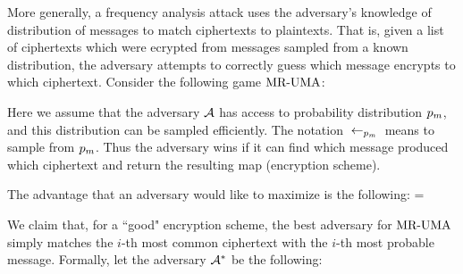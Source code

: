     More generally, a frequency analysis attack uses the adversary's knowledge of distribution of messages to match ciphertexts to plaintexts. That is, given a list of ciphertexts which were ecrypted from messages sampled from a known distribution, the adversary attempts to correctly guess which message encrypts to which ciphertext. Consider the following game $\textnormal{MR-UMA}$:
    
\begin{figure}[H]
\centering
{}
\end{figure}

Here we assume that the adversary ${\mathcal A}$ has access to probability distribution $p_m$, and this distribution can be sampled efficiently. The notation ${\:\leftarrow_{p_m}\:}$ means to sample from $p_m$. Thus the adversary wins if it can find which message produced which ciphertext and return the resulting map (encryption scheme).

The advantage that an adversary would like to maximize is the following:
\bnm
    = 
\enm

We claim that, for a ``good" encryption scheme, the best adversary for $\textnormal{MR-UMA}$ simply matches the $i$-th most common ciphertext with the $i$-th most probable message. Formally, let the adversary ${\mathcal A}^*$ be the following:

\begin{figure}[H]
 \centering
{}  
\end{figure}

